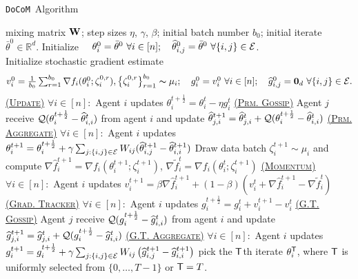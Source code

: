 \documentclass[10pt]{article} %
\theoremstyle{plain}
\theoremstyle{definition}
\theoremstyle{remark}
\newcommand{\aname}{{\tt DoCoM}}
\newcommand{\prm}{\theta}
\newcommand{\hatprm}{\widehat{\prm}}
\newcommand{\gog}{g}
\newcommand{\hatgog}{\widehat{\gog}}
\newcommand{\W}{{\bf W}}
\newcommand{\ve}{v}
\newcommand{\stocgrdf}{\nabla \widehat{f}}
\newcommand{\stocgrdfp}{\nabla \widetilde{f}}
\newcommand{\half}{\frac{1}{2}}
\begin{document}
\setlength{\textfloatsep}{.2cm}
\begin{algorithm}[hbtp]
    \caption{\aname~Algorithm}
    \label{alg:docom}
 \begin{algorithmic}[1]
     mixing matrix $\W$; step sizes $\eta$, $\gamma$, $\beta$; initial batch number $b_0$; initial iterate $\bar{\prm}^0 \in \mathbb{R}^d$. 
    \STATE Initialize $\quad \prm^0_i = \bar{\prm}^0~\forall i \in [n]; \quad \hatprm^0_{i,j} = \bar{\prm}^0~\forall \{i, j\} \in {\cal E}$. \\
    \STATE Initialize stochastic gradient estimate \\
    \vspace{-.25cm}
    \[\textstyle \ve^0_i = \frac{1}{b_0} \sum_{r=1}^{b_0} \nabla f_i(\prm_i^{0}; \zeta_i^{0,r}), \big\{\zeta_{i}^{0,r} \big\}_{r=1}^{b_0} \thicksim \mu_i; \quad \gog_i^0 = \ve_i^{0}~\forall i \in [n]; \quad \hatgog^0_{i,j} = {\bf 0}_d~\forall \{i, j\} \in {\cal E}.\]
    \vspace{-.5cm}
        \STATE \underline{\textsc{(Update)}} $\forall i \in [n]:$ Agent $i$ updates $\prm_i^{t+\half} = \prm_i^t - \eta \gog_i^t$
            \STATE \underline{\textsc{(Prm. Gossip)}} Agent $j$ receive ${\cal Q}(\prm_i^{t+\half} - \hatprm_{i,i}^t )$ from agent $i$ and update $\hatprm^{t+1}_{j,i} = \hatprm^{t}_{j,i} + {\cal Q}(\prm_i^{t+\half} - \hatprm_{i,i}^t )$
        \ENDFOR
        \STATE \underline{\textsc{(Prm. Aggregate)}} $\forall i \in [n]:$ Agent $i$ updates $\prm_i^{t+1} = \prm_i^{t+\half} + \gamma \sum_{j:\{i,j\}\in {\cal E}} W_{ij} (\hatprm_{i,j}^{t+1} - \hatprm_{i,i}^{t+1})$ \label{line:theta}
        \STATE Draw data batch $\zeta_i^{t+1} \sim \mu_i$ and compute $\stocgrdf_i^{t+1} = \nabla f_i( \theta_i^{t+1}; \zeta_i^{t+1} )$, $\stocgrdfp_i^t = \nabla f_i( \theta_i^{t}; \zeta_i^{t+1} )$
        \STATE \underline{\textsc{(Momentum)}} $\forall i \in [n]:$ Agent $i$ updates $\ve_i^{t+1} = \beta\stocgrdf_{i}^{t+1}  +  (1-\beta)(\ve_i^{t} + \stocgrdf_i^{t+1}  -  \stocgrdfp_i^{t})$
        \STATE \underline{\textsc{(Grad. Tracker)}} $\forall i \in [n]:$ Agent $i$ updates $\gog_i^{t+\half} = \gog_i^t + \ve_i^{t+1} - \ve_i^t$
        \STATE \underline{\textsc{(G.T. Gossip)}} Agent $j$ receive ${\cal Q}(\gog_i^{t+\half} - \hatgog_{i,i}^t )$ from agent $i$ and update $\hatgog_{j,i}^{t+1} = \hatgog_{j,i}^t + {\cal Q}(\gog_i^{t+\half} - \hatgog_{i,i}^t )$
        \ENDFOR
        \STATE \underline{\textsc{(G.T. Aggregate)}} $\forall i \in [n]:$ Agent $i$ updates $\gog_i^{t+1} = \gog_i^{t+\half} + \gamma \sum_{j:\{i,j\}\in {\cal E}} W_{ij} \left(\hatgog_{i,j}^{t+1} - \hatgog_{i,i}^{t+1}\right)$ \label{line:G}
    \ENDFOR
     pick the ${\sf T}$th iterate $\prm_i^{\sf T}$, where ${\sf T}$ is uniformly selected from $\{0,\ldots,T-1\}$ or ${\sf T}=T$.
\end{algorithmic}
\end{algorithm}
\end{document}
